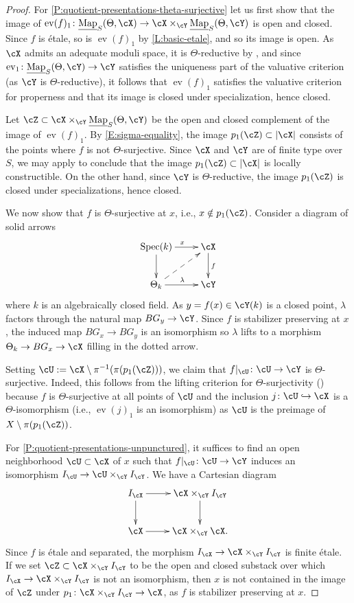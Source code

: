 \documentclass[a4paper]{amsart}
\numberwithin{equation}{section}
\theoremstyle{plain}
\theoremstyle{definition}
\DeclareMathOperator{\Spec}{Spec}
\DeclareMathOperator{\ev}{ev}
\newcommand{\hookarr}{\hookrightarrow}
\newcommand{\uMap}{\underline{{\rm Map}}}
\newcommand{\co}{\colon}
\begin{document}
\begin{proof}  
For \eqref{P:quotient-presentations-theta-surjective} let us first show that the image of
$\ev(f)_1\co \uMap_S(\Theta,\cX) \to \cX \times_{\cY} \uMap_S(\Theta,\cY)$ is open and closed.  Since $f$ is \'etale, so is $\ev(f)_1$ by \eqref{L:basic-etale}, and so its image is open. As $\cX$ admits an adequate moduli space, it is $\Theta$-reductive by , and since $\ev_1 \co \uMap_S(\Theta, \cY) \to \cY$ satisfies the uniqueness part of the valuative criterion (as $\cY$ is $\Theta$-reductive), it follows that $\ev(f)_1$ 
satisfies the valuative criterion for properness and that its image is closed under specialization, hence closed.

Let $\cZ \subset \cX \times_{\cY} \uMap_S(\Theta,\cY)$ be the open and closed complement of the image of $\ev(f)_1$.  By \eqref{E:sigma-equality}, the image $p_1(\cZ) \subset |\cX|$ consists of the points where $f$ is not $\Theta$-surjective.
Since $\cX$ and $\cY$ are of finite type over $S$, we may apply  to conclude that the image $p_1(\cZ) \subset |\cX|$ is locally constructible. On the other hand, since $\cY$ is $\Theta$-reductive, the image $p_1(\cZ)$ is closed under specializations, hence closed. 

We now show that $f$ is $\Theta$-surjective at $x$, i.e., $x \notin p_1(\cZ)$. Consider a diagram of solid arrows
$$\xymatrix{
\Spec(k) \ar[r]^x \ar[d]							&  \cX \ar[d]^f \\
 \Theta_k \ar[r]^{\lambda} \ar@{-->}[ur]					& \cY
}$$
where $k$ is an algebraically closed field. As $y=f(x) \in \cY(k)$ is a closed point,  $\lambda$ factors through the natural map $B G_y \to \cY$. Since $f$ is stabilizer preserving at $x$, the induced map $B G_x \to B G_y$ is an isomorphism
so $\lambda$ lifts to a morphism $\Theta_k \to BG_x \to \cX$ filling in the dotted arrow.

Setting $\cU := \cX \setminus \pi^{-1}( \pi(p_1(\cZ)))$, we claim that $f|_{\cU} \co \cU \to \cY$ is $\Theta$-surjective.  Indeed, this follows from the lifting criterion for $\Theta$-surjectivity () because $f$ is $\Theta$-surjective at all points of $\cU$ and the inclusion $j \co \cU \hookarr \cX$ is a $\Theta$-isomorphism (i.e., $\ev(j)_1$ is an isomorphism) as $\cU$ is the preimage of $X \setminus \pi(p_1(\cZ))$.

For \eqref{P:quotient-presentations-unpunctured},  it suffices to find an open neighborhood $\cU \subset \cX$ of $x$ such that $f|_{\cU} \co \cU \to \cY$ induces an isomorphism $I_{\cU} \to \cU \times_{\cY} I_{\cY}$.  We have a  Cartesian diagram
$$\xymatrix{
I_{\cX} \ar[r] \ar[d]		& \cX \times_{\cY} I_{\cY} \ar[d] \\
\cX	\ar[r]				 & \cX \times_{\cY} \cX.
}$$
Since $f$ is \'etale and separated, 
the morphism $I_{\cX}  \to \cX \times_{\cY} I_{\cY}$ is finite \'etale. If we set  $\cZ \subset \cX \times_{\cY} I_{\cY}$ to be the open and closed substack over which $I_{\cX}  \to \cX \times_{\cY} I_{\cY}$ is not an isomorphism, then $x$ is not contained in the image of $\cZ$ under $p_1 \co \cX \times_{\cY} I_{\cY} \to \cX$, as $f$ is stabilizer preserving at $x$.


\end{proof}
\end{document}
